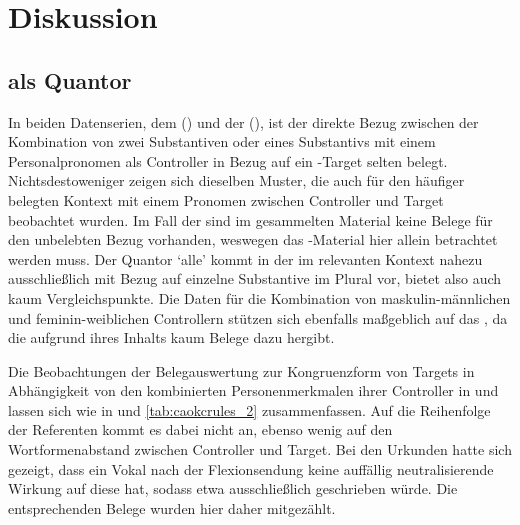 \chapter{Diskussion}
\label{ch:diskussion}

\section{ als Quantor}

In beiden Datenserien, dem 
(\CAO{}) und der  (\KC{}), ist der direkte Bezug zwischen
der Kombination von zwei Substantiven oder eines Substantivs mit einem
Personalpronomen als Controller in Bezug auf ein -Target selten
belegt. Nichtsdestoweniger zeigen sich dieselben Muster, die auch für den
häufiger belegten Kontext mit einem Pronomen zwischen Controller und Target
beobachtet wurden. Im Fall der \KC{} sind im gesammelten Material %
keine Belege für den unbelebten Bezug vorhanden, weswegen das
\CAO{}-Material hier allein betrachtet werden muss. Der Quantor
 `alle' \autocite[vgl.][606--621]{ksw2} kommt in der \KC{}
im relevanten Kontext nahezu ausschließlich mit Bezug auf einzelne
Substan\-tive im Plural vor, bietet also auch kaum Vergleichspunkte. Die Daten
für die Kombination von maskulin-männlichen und feminin-weiblichen Controllern
stützen sich ebenfalls maßgeblich auf das \CAO{}, da die \KC{}
aufgrund ihres Inhalts kaum Belege dazu hergibt.

Die Beobachtungen der Belegauswertung zur Kongruenzform von Targets in
Abhängigkeit von den kombinierten Personenmerkmalen ihrer Controller in  und  lassen sich wie in
 und \ref{tab:caokcrules_2} zusammenfassen. Auf die
Reihenfolge der Referenten kommt es dabei nicht an, ebenso wenig auf den
Wortformenabstand zwischen Controller und Target. Bei den Urkunden hatte sich
gezeigt, dass ein Vokal nach der Flexionsendung  keine auffällig
neutrali\-sie\-rende Wirkung auf diese hat, sodass etwa ausschließlich 
geschrieben würde. Die entsprechenden Belege wurden hier daher mitgezählt.

